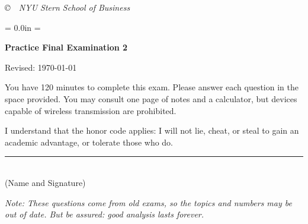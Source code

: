 \documentclass[letterpaper,12pt]{exam}
\def\HeadName{Practice Final Examination 1}
\begin{document}
\vfill
\centerline{\it \copyright \ \number\year \ NYU Stern
School of Business}


\newpage
\def\HeadName{Practice Final Examination 2}
\parindent = 0.0in
\parskip = \bigskipamount
\setcounter{page}{1} \thispagestyle{empty}
\Head

\centerline{\large \bf \HeadName}%
\centerline{Revised:  \today}

\bigskip
You have 120 minutes to complete this exam.  Please answer each
question in the space provided. You may consult one page of notes
and a calculator, but devices capable of wireless transmission are
prohibited.

I understand that the honor code applies: I will not lie, cheat,
or steal to gain an academic advantage, or tolerate those who do.

\begin{flushright}
\rule{4in}{0.5pt} \\ (Name and Signature)
\end{flushright}

{\it Note:  These questions come from old exams,
so the topics and numbers may be out of date.
But be assured:  good analysis lasts forever.}
\end{document}
